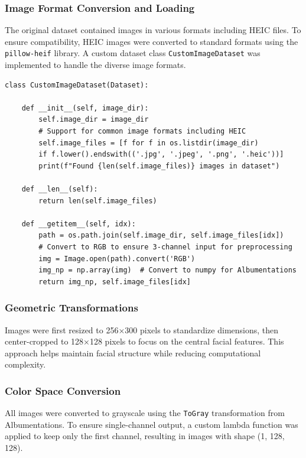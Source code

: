 \documentclass[a4paper, journal]{IEEEtran}
\begin{document}
\subsubsection{Image Format Conversion and Loading}
The original dataset contained images in various formats including HEIC files. To ensure compatibility, HEIC images were converted to standard formats using the \texttt{pillow-heif} library. A custom dataset class \texttt{CustomImageDataset} was implemented to handle the diverse image formats.

\begin{lstlisting}[caption=Custom Dataset Class for Multi-format Image Loading]
class CustomImageDataset(Dataset):

    def __init__(self, image_dir):
        self.image_dir = image_dir
        # Support for common image formats including HEIC
        self.image_files = [f for f in os.listdir(image_dir) 
        if f.lower().endswith(('.jpg', '.jpeg', '.png', '.heic'))]
        print(f"Found {len(self.image_files)} images in dataset")

    def __len__(self):
        return len(self.image_files)

    def __getitem__(self, idx):
        path = os.path.join(self.image_dir, self.image_files[idx])
        # Convert to RGB to ensure 3-channel input for preprocessing
        img = Image.open(path).convert('RGB')
        img_np = np.array(img)  # Convert to numpy for Albumentations
        return img_np, self.image_files[idx]
\end{lstlisting}

\subsubsection{Geometric Transformations}
Images were first resized to 256×300 pixels to standardize dimensions, then center-cropped to 128×128 pixels to focus on the central facial features. This approach helps maintain facial structure while reducing computational complexity.

\subsubsection{Color Space Conversion}
All images were converted to grayscale using the \texttt{ToGray} transformation from Albumentations. To ensure single-channel output, a custom lambda function was applied to keep only the first channel, resulting in images with shape (1, 128, 128).
\end{document}
